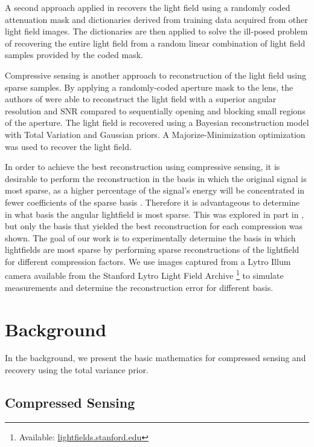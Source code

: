\documentclass[10pt,twocolumn,letterpaper]{article}
\begin{document}
A second approach applied in \cite{LFDict} recovers the light field using a randomly coded attenuation mask and dictionaries derived from training data acquired from other light field images. The dictionaries are then applied to solve the ill-posed problem of recovering the entire light field from a random linear combination of light field samples provided by the coded mask.

Compressive sensing \cite{IntroCS}\cite{CompressiveSensingMega} is another approach to reconstruction of the light field using sparse samples. By applying a randomly-coded aperture mask to the lens, the authors of \cite{SparsityInCFD} were able to reconstruct the light field with a superior angular resolution and SNR compared to sequentially opening and blocking small regions of the aperture. The light field is recovered using a Bayesian reconstruction model with Total Variation and Gaussian priors. A Majorize-Minimization optimization was used to recover the light field.

In order to achieve the best reconstruction using compressive sensing, it is desirable to perform the reconstruction in the basis in which the original signal is most sparse, as a higher percentage of the signal's energy will be concentrated in fewer coefficients of the sparse basis \cite{CompressiveSensingMega}. Therefore it is advantageous to determine in what basis the angular lightfield is most sparse. This was explored in part in \cite{mainP1}, but only the basis that yielded the best reconstruction for each compression was shown. The goal of our work is to experimentally determine the basis in which lightfields are most sparse by performing sparse reconstructions of the lightfield for different compression factors. We use images captured from a Lytro Illum camera available from the Stanford Lytro Light Field Archive \footnote{Available: \url{lightfields.stanford.edu}} to simulate measurements and determine the reconstruction error for different basis.

\section{Background}

In the background, we present the basic mathematics for compressed sensing and recovery using the total variance prior.

\subsection{Compressed Sensing}
\end{document}
